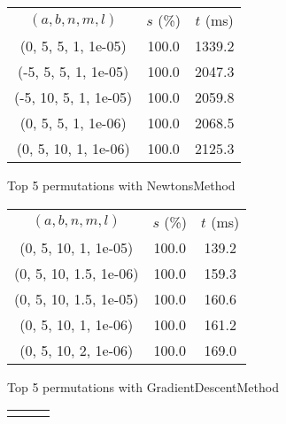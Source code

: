 \begin{figure}[H]
\label{fig:param_comp_NegativeEntropy_UniformSearch}
\begin{subfigure}[ht]{.5\textwidth}
\begin{tabular}{|c|c|c|}
\hline
\rowcolor{gray!25}
\multicolumn{3}{|c|}{NewtonsMethod} \\
\hline
\rowcolor{gray!25}
$(a,b,n,m,l)$ & $s$ (\%) & $t$ (ms) \\
\hline
(0, 5, 5, 1, 1e-05) & 100.0 & 1339.2 \\
(-5, 5, 5, 1, 1e-05) & 100.0 & 2047.3 \\
(-5, 10, 5, 1, 1e-05) & 100.0 & 2059.8 \\
(0, 5, 5, 1, 1e-06) & 100.0 & 2068.5 \\
(0, 5, 10, 1, 1e-06) & 100.0 & 2125.3 \\
\hline
\end{tabular}
\caption{Top 5 permutations with NewtonsMethod}
\label{subfig:param_comp_NegativeEntropy_NewtonsMethod_UniformSearch}
\end{subfigure}
\hfill
\begin{subfigure}[ht]{.5\textwidth}
\begin{tabular}{|c|c|c|}
\hline
\rowcolor{gray!25}
\multicolumn{3}{|c|}{GradientDescentMethod} \\
\hline
\rowcolor{gray!25}
$(a,b,n,m,l)$ & $s$ (\%) & $t$ (ms) \\
\hline
(0, 5, 10, 1, 1e-05) & 100.0 & 139.2 \\
(0, 5, 10, 1.5, 1e-06) & 100.0 & 159.3 \\
(0, 5, 10, 1.5, 1e-05) & 100.0 & 160.6 \\
(0, 5, 10, 1, 1e-06) & 100.0 & 161.2 \\
(0, 5, 10, 2, 1e-06) & 100.0 & 169.0 \\
\hline
\end{tabular}
\caption{Top 5 permutations with GradientDescentMethod}
\label{subfig:param_comp_NegativeEntropy_GradientDescentMethod_UniformSearch}
\end{subfigure}
\hfill
\begin{subfigure}[ht]{.5\textwidth}
\begin{tabular}{|c|c|c|}
\hline
\rowcolor{gray!25}
\multicolumn{3}{|c|}{ConjugateGradientMethod} \\

\end{tabular}
\end{subfigure}
\end{figure}
